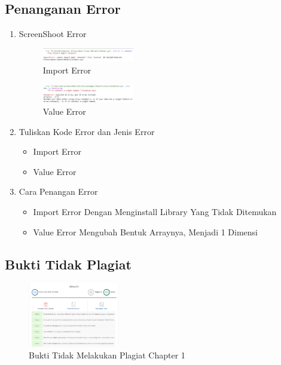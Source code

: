 \subsection{Penanganan Error}
\begin{enumerate}
	\item ScreenShoot Error
	\begin{figure}[H]
		\includegraphics[width=4cm]{figures/1174012/error/1.png}
		\centering
		\caption{Import Error}
	\end{figure}
	\begin{figure}[H]
		\includegraphics[width=4cm]{figures/1174012/error/2.png}
		\centering
		\caption{Value Error}
	\end{figure}
	\item Tuliskan Kode Error dan Jenis Error
	\begin{itemize}
		\item Import Error
		\item Value Error
	\end{itemize}
	\item Cara Penangan Error
	\begin{itemize}
		\item Import Error
		\hfill\break
		Dengan Menginstall Library Yang Tidak Ditemukan
		\item Value Error
		\hfill\break
		Mengubah Bentuk Arraynya, Menjadi 1 Dimensi
	\end{itemize}
\end{enumerate}
\subsection{Bukti Tidak Plagiat}
\begin{figure}[H]
	\includegraphics[width=4cm]{figures/1174012/plagiat/plagiat.PNG}
	\centering
	\caption{Bukti Tidak Melakukan Plagiat Chapter 1}
\end{figure}
